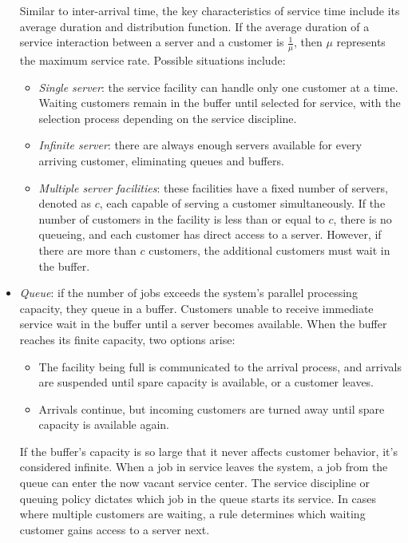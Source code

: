 \begin{itemize}
        Similar to inter-arrival time, the key characteristics of service time include its average duration and distribution function.
        If the average duration of a service interaction between a server and a customer is $\frac{1}{\mu}$, then $\mu$ represents the maximum service rate.
        Possible situations include:
        \begin{itemize}
            \item \textit{Single server}: the service facility can handle only one customer at a time. 
                Waiting customers remain in the buffer until selected for service, with the selection process depending on the service discipline.
            \item \textit{Infinite server}: there are always enough servers available for every arriving customer, eliminating queues and buffers.
            \item \textit{Multiple server facilities}: these facilities have a fixed number of servers, denoted as $c$, each capable of serving a customer simultaneously. 
                If the number of customers in the facility is less than or equal to $c$, there is no queueing, and each customer has direct access to a server. 
                However, if there are more than $c$ customers, the additional customers must wait in the buffer.
        \end{itemize}
    \item \textit{Queue}: if the number of jobs exceeds the system's parallel processing capacity, they queue in a buffer. 
        Customers unable to receive immediate service wait in the buffer until a server becomes available. 
        When the buffer reaches its finite capacity, two options arise:
        \begin{itemize}
            \item The facility being full is communicated to the arrival process, and arrivals are suspended until spare capacity is available, or a customer leaves.
            \item Arrivals continue, but incoming customers are turned away until spare capacity is available again.
        \end{itemize}
        If the buffer's capacity is so large that it never affects customer behavior, it's considered infinite. 
        When a job in service leaves the system, a job from the queue can enter the now vacant service center. 
        The service discipline or queuing policy dictates which job in the queue starts its service. 
        In cases where multiple customers are waiting, a rule determines which waiting customer gains access to a server next. 

\end{itemize}
